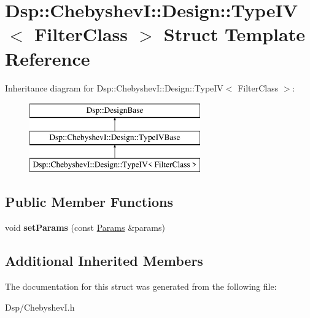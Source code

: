 \hypertarget{structDsp_1_1ChebyshevI_1_1Design_1_1TypeIV}{\section{Dsp\-:\-:Chebyshev\-I\-:\-:Design\-:\-:Type\-I\-V$<$ Filter\-Class $>$ Struct Template Reference}
\label{structDsp_1_1ChebyshevI_1_1Design_1_1TypeIV}
}
Inheritance diagram for Dsp\-:\-:Chebyshev\-I\-:\-:Design\-:\-:Type\-I\-V$<$ Filter\-Class $>$\-:\begin{figure}[H]
\begin{center}
\leavevmode
\includegraphics[height=3.000000cm]{structDsp_1_1ChebyshevI_1_1Design_1_1TypeIV}
\end{center}
\end{figure}
\subsection*{Public Member Functions}
\begin{DoxyCompactItemize}
\item 
\hypertarget{structDsp_1_1ChebyshevI_1_1Design_1_1TypeIV_a9e47114ce3c154d108267daa2c4e0809}{void {\bfseries set\-Params} (const \hyperlink{structDsp_1_1Params}{Params} \&params)}\label{structDsp_1_1ChebyshevI_1_1Design_1_1TypeIV_a9e47114ce3c154d108267daa2c4e0809}

\end{DoxyCompactItemize}
\subsection*{Additional Inherited Members}


The documentation for this struct was generated from the following file\-:\begin{DoxyCompactItemize}
\item 
Dsp/Chebyshev\-I.\-h\end{DoxyCompactItemize}
